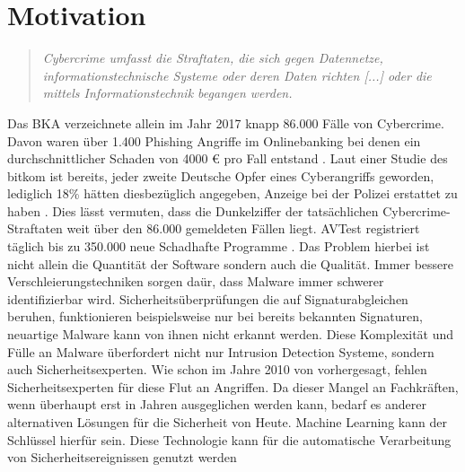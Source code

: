 \documentclass[
    12pt, %
    DIV10,
    ngerman, %
    a4paper, %
    oneside, %
    titlepage, %
    parskip=half, %
    headings=normal, %
    listof=totoc, %
    bibliography=totoc, %
    index=totoc, %
    captions=tableheading, %
    final %
]{scrreprt}
\begin{document}
\section{Motivation}
\begin{quote}
\textsl{Cybercrime umfasst die Straftaten, die sich gegen Datennetze, informationstechnische Systeme
oder deren Daten richten [...] oder die mittels Informationstechnik
begangen werden. \parencite{Cybercrime2017}}
\end{quote}
Das BKA verzeichnete allein im Jahr 2017 knapp 86.000 Fälle von Cybercrime. Davon waren über 1.400 Phishing Angriffe im Onlinebanking bei denen ein durchschnittlicher Schaden von 4000 € pro Fall entstand \parencite{Cybercrime2017}. Laut einer Studie des \ac{bitkom} ist bereits, jeder zweite Deutsche Opfer eines Cyberangriffs geworden, lediglich 18\% hätten diesbezüglich angegeben, Anzeige bei der Polizei erstattet zu haben \parencite{Bitkome.V.2017}. Dies lässt vermuten, dass die Dunkelziffer der tatsächlichen Cybercrime-Straftaten weit über den 86.000 gemeldeten Fällen liegt. AVTest registriert täglich bis zu 350.000 neue Schadhafte Programme \parencite{AV-TEST2019}. Das Problem hierbei ist nicht allein die Quantität der Software sondern auch die Qualität. Immer bessere Verschleierungstechniken sorgen daür, dass Malware immer schwerer identifizierbar wird. Sicherheitsüberprüfungen die auf Signaturabgleichen beruhen, funktionieren beispielsweise nur bei bereits bekannten Signaturen, neuartige Malware kann von ihnen nicht erkannt werden. Diese Komplexität und Fülle an Malware überfordert nicht nur Intrusion Detection Systeme, sondern auch Sicherheitsexperten. Wie schon im Jahre 2010 von \citeauthor{Evans2010} vorhergesagt, fehlen Sicherheitsexperten für diese Flut an Angriffen. Da dieser Mangel an Fachkräften, wenn überhaupt erst in Jahren ausgeglichen werden kann, bedarf es anderer alternativen Lösungen für die Sicherheit von Heute. Machine Learning kann der Schlüssel hierfür sein. Diese Technologie kann für die automatische Verarbeitung von Sicherheitsereignissen genutzt werden
\end{document}
